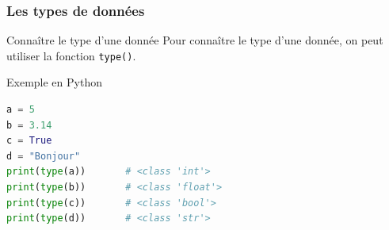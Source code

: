 \documentclass[10pt]{beamer}
\begin{document}
\begin{frame}[containsverbatim]
\frametitle{Les types de données}

\begin{block}{Connaître le type d'une donnée}
Pour connaître le type d'une donnée, on peut utiliser la fonction
\texttt{type()}.
\end{block}

\vspace{0.2cm}

\begin{exampleblock}{Exemple en Python}
\begin{lstlisting}[language=Python]
a = 5
b = 3.14
c = True
d = "Bonjour"
print(type(a))       # <class 'int'>
print(type(b))       # <class 'float'>
print(type(c))       # <class 'bool'>
print(type(d))       # <class 'str'>
\end{lstlisting}
\end{exampleblock}

\end{frame}
\end{document}
